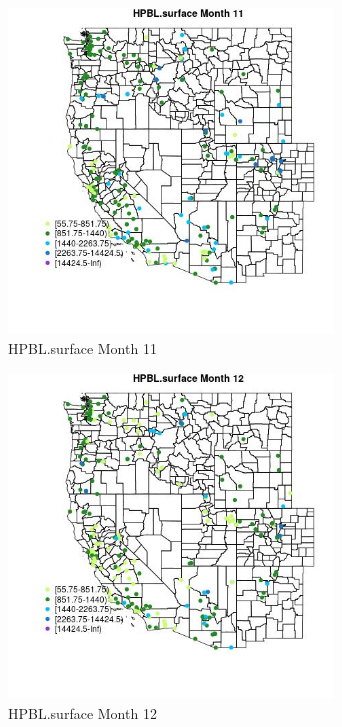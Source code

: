 \begin{figure} 
\centering  
\includegraphics[width=0.77\textwidth]{Code_Outputs/Report_ML_input_PM25_Step4_part_e_de_duplicated_aveswNAs_MapObsMo11HPBLsurface.jpg} 
\caption{\label{fig:Report_ML_input_PM25_Step4_part_e_de_duplicated_aveswNAsMapObsMo11HPBLsurface}HPBL.surface Month 11} 
\end{figure} 
 

\begin{figure} 
\centering  
\includegraphics[width=0.77\textwidth]{Code_Outputs/Report_ML_input_PM25_Step4_part_e_de_duplicated_aveswNAs_MapObsMo12HPBLsurface.jpg} 
\caption{\label{fig:Report_ML_input_PM25_Step4_part_e_de_duplicated_aveswNAsMapObsMo12HPBLsurface}HPBL.surface Month 12} 
\end{figure} 
 

